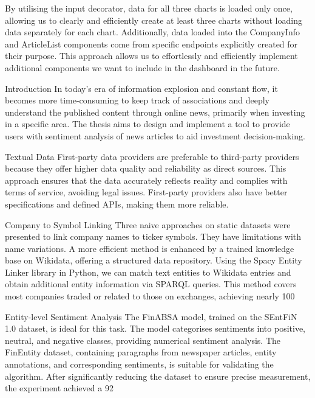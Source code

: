 By utilising the input decorator, data for all three charts is loaded only once, allowing us to clearly and efficiently create at least three charts without loading data separately for each chart. Additionally, data loaded into the CompanyInfo and ArticleList components come from specific endpoints explicitly created for their purpose. This approach allows us to effortlessly and efficiently implement additional components we want to include in the dashboard in the future.

Introduction
In today's era of information explosion and constant flow, it becomes more time-consuming to keep track of associations and deeply understand the published content through online news, primarily when investing in a specific area. The thesis aims to design and implement a tool to provide users with sentiment analysis of news articles to aid investment decision-making. 

Textual Data
First-party data providers are preferable to third-party providers because they offer higher data quality and reliability as direct sources. This approach ensures that the data accurately reflects reality and complies with terms of service, avoiding legal issues. First-party providers also have better specifications and defined APIs, making them more reliable.

Company to Symbol Linking
Three naive approaches on static datasets were presented to link company names to ticker symbols. They have limitations with name variations. A more efficient method is enhanced by a trained knowledge base on Wikidata, offering a structured data repository. Using the Spacy Entity Linker library in Python, we can match text entities to Wikidata entries and obtain additional entity information via SPARQL queries. This method covers most companies traded or related to those on exchanges, achieving nearly 100%

Entity-level Sentiment Analysis
The FinABSA model, trained on the SEntFiN 1.0 dataset, is ideal for this task. The model categorises sentiments into positive, neutral, and negative classes, providing numerical sentiment analysis. The FinEntity dataset, containing paragraphs from newspaper articles, entity annotations, and corresponding sentiments, is suitable for validating the algorithm. After significantly reducing the dataset to ensure precise measurement, the experiment achieved a 92%

